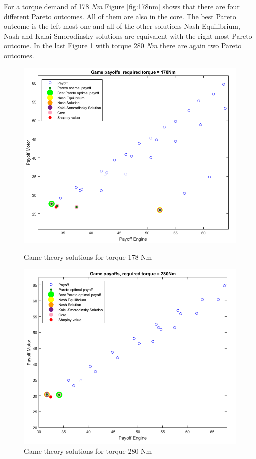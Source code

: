 For a torque demand of 178 \textit{Nm} Figure \ref{fig:178nm} shows that there are four different Pareto outcomes. All of them are also in the core. The best Pareto outcome is the left-most one and all of the other solutions Nash Equilibrium, Nash and Kalai-Smorodinsky solutions are equivalent with the right-most Pareto outcome. In the last Figure \ref{fig:280nm} with torque 280 \textit{Nm} there are again two Pareto outcomes.

\begin{figure}[h]
\centering
\begin{minipage}{.5\textwidth}
 	\centering
	\includegraphics[scale=0.38]{figures/gametheory/178nm}
	\caption{Game theory solutions for torque 178 Nm}
	\label{fig:178nm}
\end{minipage}%
\begin{minipage}{.5\textwidth}
  	\centering
	\includegraphics[scale=0.392]{figures/gametheory/280nm}
  	\caption{Game theory solutions for torque 280 Nm}
  	\label{fig:280nm}
\end{minipage}
\end{figure}

